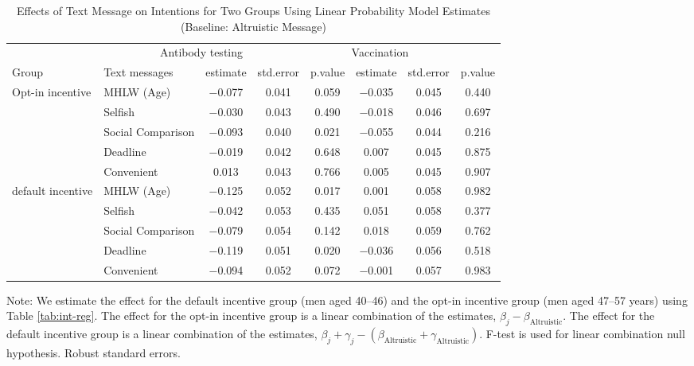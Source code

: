 \begin{table}

\caption{Effects of Text Message on Intentions for Two Groups Using Linear Probability Model Estimates (Baseline: Altruistic Message) \label{tab:int-reg-ftest2}}
\centering
\fontsize{9}{11}\selectfont
\begin{threeparttable}
\begin{tabular}[t]{>{\raggedright\arraybackslash}p{5em}lcccccc}
\toprule
\multicolumn{2}{c}{ } & \multicolumn{3}{c}{Antibody testing} & \multicolumn{3}{c}{Vaccination} \\
\cmidrule(l{3pt}r{3pt}){3-5} \cmidrule(l{3pt}r{3pt}){6-8}
Group & Text messages & estimate & std.error & p.value & estimate  & std.error  & p.value \\
\midrule
Opt-in incentive & MHLW (Age) & \num{-0.077} & \num{0.041} & \num{0.059} & \num{-0.035} & \num{0.045} & \num{0.440}\\
 & Selfish & \num{-0.030} & \num{0.043} & \num{0.490} & \num{-0.018} & \num{0.046} & \num{0.697}\\
 & Social Comparison & \num{-0.093} & \num{0.040} & \num{0.021} & \num{-0.055} & \num{0.044} & \num{0.216}\\
 & Deadline & \num{-0.019} & \num{0.042} & \num{0.648} & \num{0.007} & \num{0.045} & \num{0.875}\\
 & Convenient & \num{0.013} & \num{0.043} & \num{0.766} & \num{0.005} & \num{0.045} & \num{0.907}\\
default incentive & MHLW (Age) & \num{-0.125} & \num{0.052} & \num{0.017} & \num{0.001} & \num{0.058} & \num{0.982}\\
 & Selfish & \num{-0.042} & \num{0.053} & \num{0.435} & \num{0.051} & \num{0.058} & \num{0.377}\\
 & Social Comparison & \num{-0.079} & \num{0.054} & \num{0.142} & \num{0.018} & \num{0.059} & \num{0.762}\\
 & Deadline & \num{-0.119} & \num{0.051} & \num{0.020} & \num{-0.036} & \num{0.056} & \num{0.518}\\
 & Convenient & \num{-0.094} & \num{0.052} & \num{0.072} & \num{-0.001} & \num{0.057} & \num{0.983}\\
\bottomrule
\end{tabular}
\begin{tablenotes}
\item Note: We estimate the effect for the default incentive group (men aged 40--46) and the opt-in incentive group (men aged 47--57 years) using  Table \ref{tab:int-reg}. The effect for the opt-in incentive group is a linear combination of the estimates, $\beta_j - \beta_{\text{Altruistic}}$. The effect for the default incentive group is a linear combination of the estimates, $\beta_j + \gamma_j - (\beta_{\text{Altruistic}} + \gamma_{\text{Altruistic}})$. F-test is used for linear combination null hypothesis. Robust standard errors.
\end{tablenotes}
\end{threeparttable}
\end{table}
